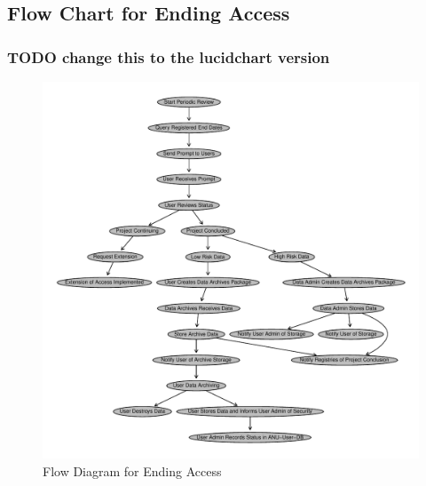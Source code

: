 \documentclass[a4paper]{article}
\begin{document}
\subsection{Flow Chart for Ending Access}
\label{sec-4-1}
\subsubsection{\textbf{TODO} change this to the lucidchart version}
\label{sec-4-1-1}


\begin{figure}[!h]
\centering
\includegraphics[width=\textwidth]{DataAccessFlowDiagram-EndAccess.pdf}
\caption{Flow Diagram for Ending Access}
\label{fig:DataAccessFlowDiagram-EndAccess}
\end{figure}
\clearpage
\end{document}
